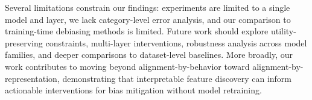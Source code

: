 Several limitations constrain our findings: experiments are limited to a single model and layer, we lack category-level error analysis, and our comparison to training-time debiasing methods is limited. Future work should explore utility-preserving constraints, multi-layer interventions, robustness analysis across model families, and deeper comparisons to dataset-level baselines. More broadly, our work contributes to moving beyond alignment-by-behavior toward alignment-by-representation, demonstrating that interpretable feature discovery can inform actionable interventions for bias mitigation without model retraining.
